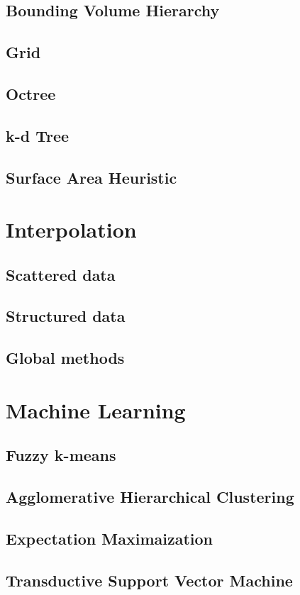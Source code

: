 \subsection{Bounding Volume Hierarchy}
\subsection{Grid}
\subsection{Octree}
\subsection{k-d Tree}
\subsection{Surface Area Heuristic}

\section{Interpolation}
\subsection{Scattered data}
\subsection{Structured data}
\subsection{Global methods}


\section{Machine Learning}

\subsection{Fuzzy k-means}
\subsection{Agglomerative Hierarchical Clustering}
\subsection{Expectation Maximaization}
\subsection{Transductive Support Vector Machine}